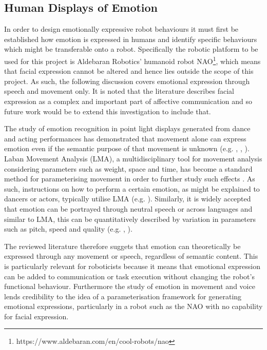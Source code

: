 \documentclass[11pt,a4paper]{report}
\begin{document}
\subsection{Human Displays of Emotion}
In order to design emotionally expressive robot behaviours it must first be established how emotion is expressed in humans and identify specific behaviours which might be transferable onto a robot. Specifically the robotic platform to be used for this project is Aldebaran Robotics' humanoid robot NAO\footnote{https://www.aldebaran.com/en/cool-robots/nao}, which means that facial expression cannot be altered and hence lies outside the scope of this project.  As such, the following discussion covers emotional expression through speech and movement only. It is noted that the literature describes facial expression as a complex and important part of affective communication and so future work would be to extend this investigation to include that.

The study of emotion recognition in point light displays generated from dance and acting performances has demonstrated that movement alone can express emotion even if the semantic purpose of that movement is unknown (e.g. \cite{dittrich1996perception}, \cite{pollick2001perceiving}, \cite{atkinson2004emotion}). Laban Movement Analysis (LMA), a multidisciplinary tool for movement analysis considering parameters such as weight, space and time, has become a standard method for parameterising movement in order to further study such effects \cite{lab2011}. As such, instructions on how to perform a certain emotion, as might be explained to dancers or actors, typically utilise LMA (e.g. \cite{newlove1993laban}). Similarly, it is widely accepted that emotion can be portrayed through neutral speech \cite{neumann2000mood} or across languages \cite{scherer2000cross} and similar to LMA, this can be quantitatively described by variation in parameters such as pitch, speed and quality (e.g. \cite{scherer1986vocal}, \cite{cowie2001emotion}). 

The reviewed literature therefore suggets that emotion can theoretically be expressed through any movement or speech, regardless of semantic content. This is particularly relevant for roboticists because it means that emotional expression can be added to communication or task execution without changing the robot's functional behaviour. Furthermore the study of emotion in movement and voice lends credibility to the idea of a parameterisation framework for generating emotional expressions, particularly in a robot such as the NAO with no capability for facial expression. 
\end{document}

